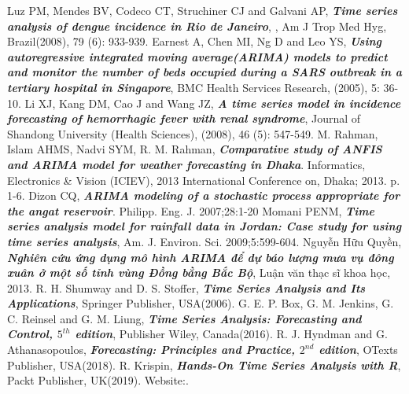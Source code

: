\documentclass[12pt, a4paper,oneside]{book}
\theoremstyle{definition}
\begin{document}
\begin{thebibliography}{99}
	 Luz PM, Mendes BV, Codeco CT, Struchiner CJ and Galvani AP, \textbf{\textit{Time series analysis of dengue incidence in Rio de Janeiro}}, , Am J Trop Med Hyg, Brazil(2008), 79 (6): 933-939.
     Earnest A, Chen MI, Ng D and Leo YS, \textbf{\textit{Using autoregressive integrated moving average(ARIMA) models to predict and monitor the number of beds occupied during a SARS outbreak in a tertiary hospital in Singapore}}, BMC Health Services Research, (2005), 5: 36-10.
      Li XJ, Kang DM, Cao J and Wang JZ, \textbf{\textit{A time series model in incidence forecasting of hemorrhagic fever with renal syndrome}}, Journal of Shandong University (Health Sciences), (2008), 46 (5): 547-549.
     M. Rahman, Islam AHMS, Nadvi SYM, R. M. Rahman, \textit{\textbf{Comparative study of ANFIS and ARIMA model for weather forecasting in Dhaka}}. Informatics, Electronics \& Vision (ICIEV), 2013 International Conference on, Dhaka; 2013. p. 1-6.
     Dizon CQ, \textit{\textbf{ARIMA modeling of a stochastic process appropriate for the angat reservoir}}. Philipp. Eng. J. 2007;28:1-20
     Momani PENM, \textit{\textbf{Time series analysis model for  rainfall data in Jordan: Case study for using time series analysis}}, Am. J. Environ. Sci. 2009;5:599-604.
     Nguyễn Hữu Quyền, \textit{\textbf{Nghiên cứu ứng dụng mô hình ARIMA để dự báo lượng mưa vụ đông xuân ở một số tỉnh vùng Đồng bằng Bắc Bộ}}, Luận văn thạc sĩ khoa học, 2013.	
	 R. H. Shumway and D. S. Stoffer, \textbf{\textit{Time Series Analysis and Its Applications}}, Springer Publisher, USA(2006).
	 G. E. P. Box, G. M. Jenkins, G. C. Reinsel and G. M. Liung, \textbf{\textit{Time Series Analysis: Forecasting and Control, $5^{th}$ edition}}, Publisher Wiley, Canada(2016).
	 R. J. Hyndman and G. Athanasopoulos, \textbf{\textit{Forecasting: Principles and Practice, $2^{nd}$ edition}}, OTexts Publisher, USA(2018).
	 R. Krispin,  \textbf{\textit{Hands-On Time Series Analysis with R}}, Packt Publisher, UK(2019). 	
	 Website:.
	

		
\end{thebibliography}	
\end{document}
